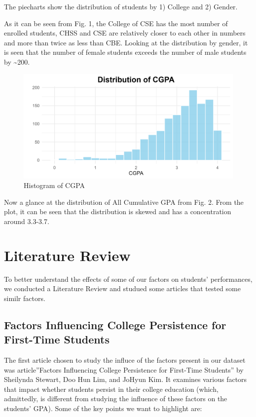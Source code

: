 \documentclass[
  12pt,
]{article}
\begin{document}
The piecharts show the distribution of students by 1) College and 2)
Gender.

As it can be seen from Fig. 1, the College of CSE has the most number of
enrolled students, CHSS and CSE are relatively closer to each other in
numbers and more than twice as less than CBE. Looking at the
distribution by gender, it is seen that the number of female students
exceeds the number of male students by \textasciitilde200.

\begin{figure}
\includegraphics[width=0.8\linewidth]{histogram} \caption{Histogram of CGPA}\label{fig:unnamed-chunk-6}
\end{figure}

Now a glance at the distribution of All Cumulative GPA from Fig. 2. From
the plot, it can be seen that the distribution is skewed and has a
concentration around 3.3-3.7.

\section{Literature Review}\label{literature-review}

To better understand the effects of some of our factors on students'
performances, we conducted a Literature Review and studued some articles
that tested some similr factors.

\subsection{Factors Influencing College Persistence for First-Time
Students}\label{factors-influencing-college-persistence-for-first-time-students}

The first article chosen to study the influce of the factors present in
our dataset was article''Factors Influencing College Persistence for
First-Time Students'' by Sheilynda Stewart, Doo Hun Lim, and JoHyun Kim.
It examines various factors that impact whether students persist in
their college education (which, admittedly, is different from studying
the influence of these factors on the students' GPA). Some of the key
points we want to highlight are:
\end{document}
